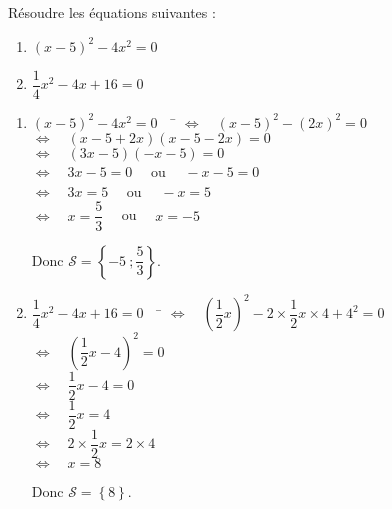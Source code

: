 \documentclass[a4paper,11pt,exos]{nsi} %
\begin{document}
\maketitle

\begin{exercice}
    Résoudre les équations suivantes :
    \begin{multicols}{2}
        \begin{enumerate}
            \item $(x-5)^2-4x^2=0$
	        \item $\dfrac{1}{4}x^2-4x+16=0$
        \end{enumerate}
    \end{multicols}
    
\end{exercice}

\begin{enumerate}
    \item \begin{tabbing}
        $(x-5)^2-4x^2=0 \quad$    \=  $\iff\quad (x-5)^2-(2x)^2=0$\\
        \>  $\iff\quad  (x-5+2x)(x-5-2x)=0$\\
        \>  $\iff\quad  (3x-5)(-x-5)=0$\\
        \>  $\iff\quad  3x-5=0 \quad$ ou $\quad -x-5=0$\\
        \>  $\iff\quad  3x=5\quad$ ou $\quad -x = 5$\\
        \>  $\iff\quad  x=\dfrac{5}{3}\quad$ ou $\quad x=-5$
    \end{tabbing}
    Donc $\mathcal{S}=\left\{-5\ ;\dfrac{5}{3} \right\}$.

    \item \begin{tabbing}
        $\dfrac{1}{4}x^2-4x+16=0 \quad$    \=  $\iff\quad \left(\dfrac{1}{2}x\right)^2-2\times \dfrac{1}{2}x\times 4+4^2=0$\\[.5em]
        \>  $\iff\quad  \left(\dfrac{1}{2}x-4\right)^2=0$\\[.5em]
        \>  $\iff\quad  \dfrac{1}{2}x-4=0$\\[.5em]
        \>  $\iff\quad  \dfrac{1}{2}x=4$\\[.5em]
        \>  $\iff\quad  2\times \dfrac{1}{2}x=2\times 4$\\[.5em]
        \>  $\iff\quad  x=8$
    \end{tabbing}
    Donc $\mathcal{S}=\left\{8 \right\}$.
\end{enumerate}
\end{document}
